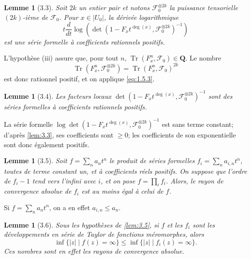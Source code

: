 \documentclass[12pt,a4paper]{amsart}
\theoremstyle{plain}
\newtheorem{lemme}[theoreme]{Lemme}
\theoremstyle{definition}
\theoremstyle{remark}
\DeclareMathOperator{\Tr}{Tr}
\newcommand{\Q}{\mathbf{Q}}
\numberwithin{equation}{section}
\begin{document}
\begin{lemme}[3.3]\label{lem:3.3}
Soit $2k$ un entier pair et notons $\mathscr{F}_0^{\otimes 2k}$ la puissance tensorielle $(2k)$-i\`eme de $\mathscr{F}_0$. Pour $x\in|U_0|$, la d\'eriv\'ee logarithmique
\[
t\frac{d}{dt}\log(\det(1-F_x t^{\deg(x)},\mathscr{F}_0^{\otimes 2k})^{-1})
\]
est une s\'erie formelle \`a coefficients rationnels positifs.
\end{lemme}

L'hypoth\`ese (iii) assure que, pour tout $n$, $\Tr(F_x^n,\mathscr{F}_0)\in\Q$. Le nombre
\[
\Tr(F_x^n,\mathscr{F}_0^{\otimes 2k}) = \Tr(F_x^n,\mathscr{F}_0)^{2k}
\]
est donc rationnel positif, et on applique \eqref{eq:1.5.3}.

\begin{lemme}[3.4]\label{lem:3.4}
Les facteurs locaux $\det(1-F_x t^{\deg(x)},\mathscr{F}_0^{\otimes 2k})^{-1}$ sont des s\'eries formelles \`a coefficients rationnels positifs.
\end{lemme}

La s\'erie formelle $\log\det(1-F_x t^{\deg(x)},\mathscr{F}_0^{\otimes 2k})^{-1}$ est sans terme constant; d'apr\`es \eqref{lem:3.3}, ses coefficients sont $\ge 0$; les coefficients de son exponentielle sont donc \'egalement positifs.

\begin{lemme}[3.5]\label{lem:3.5}
Soit $f=\sum_n a_n t^n$ le produit de s\'eries formelles $f_i=\sum_n a_{i,n}t^n$, toutes de terme constant un, et \`a coefficients r\'eels positifs. On suppose que l'ordre de $f_i-1$ tend vers l'infini avec $i$, et on pose $f=\prod_i f_i$. Alors, le rayon de convergence absolue de $f_i$ est au moins \'egal \`a celui de $f$.
\end{lemme}

Si $f=\sum_n a_n t^n$, on a en effet $a_{i,n}\le a_n$.

\begin{lemme}[3.6]\label{lem:3.6}
Sous les hypoth\`eses de \eqref{lem:3.5}, si $f$ et les $f_i$ sont les d\'eveloppements en s\'erie de Taylor de fonctions m\'eromorphes, alors
\[
\inf\{|z|\mid f(z)=\infty\} \le \inf\{|z|\mid f_i(z)=\infty\}.
\]
Ces nombres sont en effet les rayons de convergence absolue.
\end{lemme}
\end{document}
